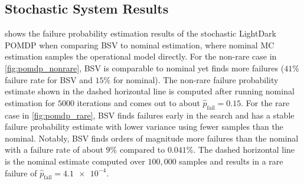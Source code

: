 \subsection{Stochastic System Results}\label{sec:pomdp_results}
 shows the failure probability estimation results of the stochastic LightDark POMDP when comparing BSV to nominal estimation, where nominal MC estimation samples the operational model directly.
For the non-rare case in \cref{fig:pomdp_nonrare}, BSV is comparable to nominal yet finds more failures ($41\%$ failure rate for BSV and $15\%$ for nominal).
The non-rare failure probability estimate shown in the dashed horizontal line is computed after running nominal estimation for $5000$ iterations and comes out to about $\hat{p}_\text{fail} = 0.15$.
For the rare case in \cref{fig:pomdp_rare}, BSV finds failures early in the search and has a stable failure probability estimate with lower variance using fewer samples than the nominal.
Notably, BSV finds orders of magnitude more failures than the nominal with a failure rate of about $9\%$ compared to $0.041\%$.
The dashed horizontal line is the nominal estimate computed over $100{,}000$ samples and results in a rare failure of $\hat{p}_\text{fail}=\num{4.1e-4}$.


